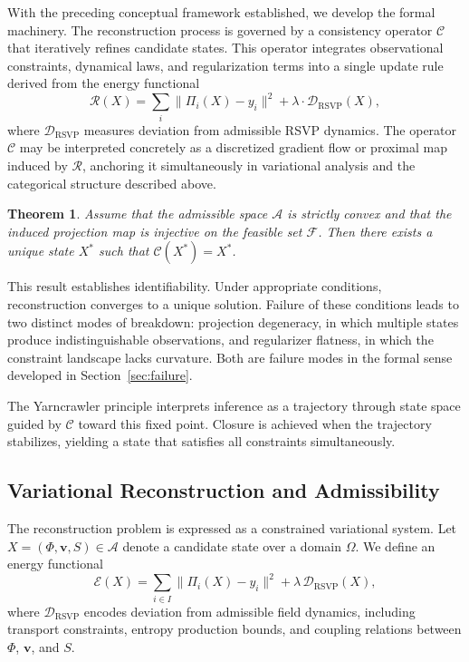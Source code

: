 \documentclass[12pt, oneside]{article}
\newtheorem{theorem}{Theorem}
\begin{document}
With the preceding conceptual framework established, we develop the formal machinery. The reconstruction process is governed by a consistency operator $\mathcal{C}$ that iteratively refines candidate states. This operator integrates observational constraints, dynamical laws, and regularization terms into a single update rule derived from the energy functional
\[
\mathcal{R}(X) = \sum_i \|\Pi_i(X) - y_i\|^2 + \lambda \cdot \mathcal{D}_{\text{RSVP}}(X),
\]
where $\mathcal{D}_{\text{RSVP}}$ measures deviation from admissible RSVP dynamics. The operator $\mathcal{C}$ may be interpreted concretely as a discretized gradient flow or proximal map induced by $\mathcal{R}$, anchoring it simultaneously in variational analysis and the categorical structure described above.

\begin{theorem}
Assume that the admissible space $\mathcal{A}$ is strictly convex and that the induced projection map is injective on the feasible set $\mathcal{F}$. Then there exists a unique state $X^\ast$ such that $\mathcal{C}(X^\ast) = X^\ast$.
\end{theorem}

This result establishes identifiability. Under appropriate conditions, reconstruction converges to a unique solution. Failure of these conditions leads to two distinct modes of breakdown: projection degeneracy, in which multiple states produce indistinguishable observations, and regularizer flatness, in which the constraint landscape lacks curvature. Both are failure modes in the formal sense developed in Section~\ref{sec:failure}.

The Yarncrawler principle interprets inference as a trajectory through state space guided by $\mathcal{C}$ toward this fixed point. Closure is achieved when the trajectory stabilizes, yielding a state that satisfies all constraints simultaneously.

\subsection{Variational Reconstruction and Admissibility}

The reconstruction problem is expressed as a constrained variational system. Let $X = (\Phi, \mathbf{v}, S) \in \mathcal{A}$ denote a candidate state over a domain $\Omega$. We define an energy functional
\[
\mathcal{E}(X) = \sum_{i \in I} \|\Pi_i(X) - y_i\|^2 + \lambda \, \mathcal{D}_{\text{RSVP}}(X),
\]
where $\mathcal{D}_{\text{RSVP}}$ encodes deviation from admissible field dynamics, including transport constraints, entropy production bounds, and coupling relations between $\Phi$, $\mathbf{v}$, and $S$.
\end{document}
